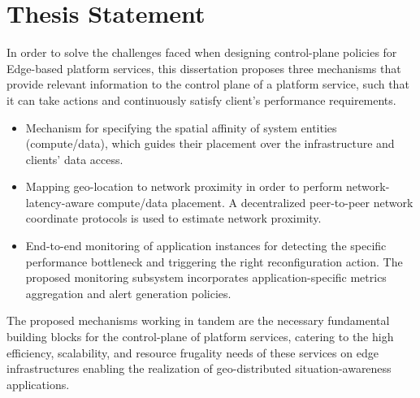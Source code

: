 \section{Thesis Statement}
In order to solve the challenges faced when designing control-plane policies for Edge-based platform services, this dissertation proposes three mechanisms that provide relevant information to the control plane of a platform service, such that it can take actions and continuously satisfy client's performance requirements.
\begin{itemize}
\item Mechanism for specifying the spatial affinity of system entities (compute/data), which guides their placement over the infrastructure and clients' data access. 
\item Mapping geo-location to network proximity in order to perform network-latency-aware compute/data placement. A decentralized peer-to-peer network coordinate protocols is used to estimate network proximity.
\item End-to-end monitoring of application instances for detecting the specific performance bottleneck and triggering the right reconfiguration action. The proposed monitoring subsystem incorporates application-specific metrics aggregation and alert generation policies. 
\end{itemize}

The proposed mechanisms working in tandem are the necessary fundamental building blocks for the control-plane of platform services, catering to the high efficiency, scalability, and resource frugality needs of these services on edge infrastructures enabling the realization of geo-distributed situation-awareness applications. 

